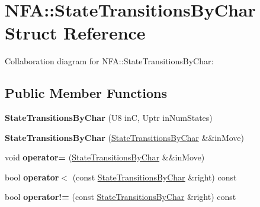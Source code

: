 \hypertarget{struct_n_f_a_1_1_state_transitions_by_char}{}\section{N\+FA\+:\+:State\+Transitions\+By\+Char Struct Reference}
\label{struct_n_f_a_1_1_state_transitions_by_char}


Collaboration diagram for N\+FA\+:\+:State\+Transitions\+By\+Char\+:
\subsection*{Public Member Functions}
\begin{DoxyCompactItemize}
\item 
\mbox{\label{struct_n_f_a_1_1_state_transitions_by_char_a5e2471b28cb7fa808d855624843d07ad}} 
{\bfseries State\+Transitions\+By\+Char} (U8 inC, Uptr in\+Num\+States)
\item 
\mbox{\label{struct_n_f_a_1_1_state_transitions_by_char_aac2fd10f175c019a59a0743a0d4aae93}} 
{\bfseries State\+Transitions\+By\+Char} (\mbox{\hyperlink{struct_n_f_a_1_1_state_transitions_by_char}{State\+Transitions\+By\+Char}} \&\&in\+Move)
\item 
\mbox{\label{struct_n_f_a_1_1_state_transitions_by_char_a776d72f9dcdac041454bf41ef82f7ff5}} 
void {\bfseries operator=} (\mbox{\hyperlink{struct_n_f_a_1_1_state_transitions_by_char}{State\+Transitions\+By\+Char}} \&\&in\+Move)
\item 
\mbox{\label{struct_n_f_a_1_1_state_transitions_by_char_ab59ef8fe522fc9e59396c77cfec5e49d}} 
bool {\bfseries operator$<$} (const \mbox{\hyperlink{struct_n_f_a_1_1_state_transitions_by_char}{State\+Transitions\+By\+Char}} \&right) const
\item 
\mbox{\label{struct_n_f_a_1_1_state_transitions_by_char_afeec485243cd457792e33e2259d7178a}} 
bool {\bfseries operator!=} (const \mbox{\hyperlink{struct_n_f_a_1_1_state_transitions_by_char}{State\+Transitions\+By\+Char}} \&right) const
\end{DoxyCompactItemize}

